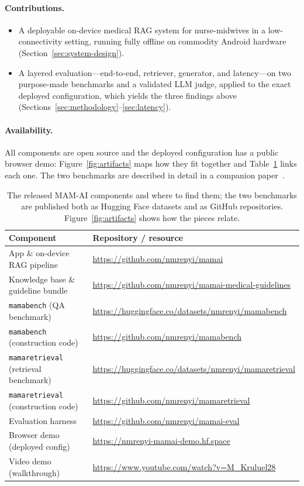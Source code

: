 \paragraph{Contributions.}
\begin{itemize}
  \item A deployable on-device medical RAG system for nurse-midwives in a
  low-connectivity setting, running fully offline on commodity Android
  hardware (Section~\ref{sec:system-design}).
  \item A layered evaluation---end-to-end, retriever, generator, and
  latency---on two purpose-made benchmarks and a validated LLM judge, applied
  to the exact deployed configuration, which yields the three findings above
  (Sections~\ref{sec:methodology}--\ref{sec:latency}).
\end{itemize}

\paragraph{Availability.}
All components are open source and the deployed configuration has a public
browser demo: Figure~\ref{fig:artifacts} maps how they fit together and
Table~\ref{tab:artifacts} links each one. The two benchmarks are described in
detail in a companion paper~\cite{ren2026mamabench}.

\begin{table}[t]
\centering
\footnotesize
\setlength{\tabcolsep}{5pt}
\renewcommand{\arraystretch}{1.18}
\begin{tabular}{@{}ll@{}}
\toprule
\textbf{Component} & \textbf{Repository / resource} \\
\midrule
App \& on-device RAG pipeline & \url{https://github.com/nmrenyi/mamai} \\
Knowledge base \& guideline bundle & \url{https://github.com/nmrenyi/mamai-medical-guidelines} \\
\texttt{mamabench} (QA benchmark) & \url{https://huggingface.co/datasets/nmrenyi/mamabench} \\
\texttt{mamabench} (construction code) & \url{https://github.com/nmrenyi/mamabench} \\
\texttt{mamaretrieval} (retrieval benchmark) & \url{https://huggingface.co/datasets/nmrenyi/mamaretrieval} \\
\texttt{mamaretrieval} (construction code) & \url{https://github.com/nmrenyi/mamaretrieval} \\
Evaluation harness & \url{https://github.com/nmrenyi/mamai-eval} \\
Browser demo (deployed config) & \url{https://nmrenyi-mamai-demo.hf.space} \\
Video demo (walkthrough) & \url{https://www.youtube.com/watch?v=M_Kruluel28} \\
\bottomrule
\end{tabular}
\caption{The released MAM-AI components and where to find them; the two
benchmarks are published both as Hugging Face datasets and as GitHub
repositories. Figure~\ref{fig:artifacts} shows how the pieces relate.}
\label{tab:artifacts}
\end{table}

